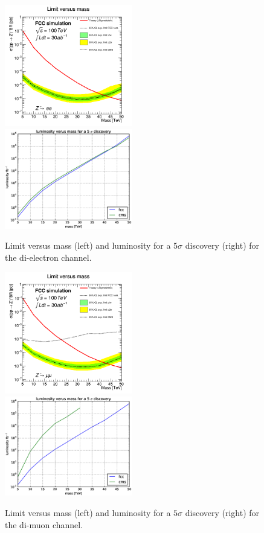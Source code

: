 \documentclass{cernrep}
\begin{document}
\begin{figure}[!htb]\centering
\includegraphics[width=0.495\textwidth]{Fig/lim_Zprime_ee_fcc_cms.png}
\includegraphics[width=0.495\textwidth]{Fig/DiscoveryPotential_ee.eps}
\caption{Limit versus mass (left) and luminosity for a $5\sigma$ discovery (right) for the
 di-electron channel.}
\label{fig:zpee_lim}
\end{figure}

\begin{figure}[!htb]\centering
\includegraphics[width=0.495\textwidth]{Fig/lim_Zprime_mumu_fcc_cms.png}
\includegraphics[width=0.495\textwidth]{Fig/DiscoveryPotential_mumu.eps}
\caption{Limit versus mass (left) and luminosity for a $5\sigma$ discovery (right) for the
 di-muon channel.}
\label{fig:zpmumu_lim}
\end{figure}
\end{document}
